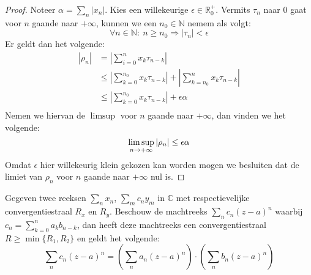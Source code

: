 \documentclass[main.tex]{subfiles}
\begin{document}
\begin{bst}
\begin{proof}
    Noteer $\alpha = \sum_{n}|x_{n}|$.
    Kies een willekeurige $\epsilon \in \mathbb{R}_{0}^{+}$.
    Vermits $\tau_{n}$ naar $0$ gaat voor $n$ gaande naar $+\infty$, kunnen we een $n_{0}\in \mathbb{N}$ nemem als volgt:
    \[ \forall n\in \mathbb{N}:\ n \ge n_{0} \Rightarrow |\tau_{n}| < \epsilon \]
    Er geldt dan het volgende:
    \[
    \begin{array}{rl}
      |\rho_{n}|
      &= \left|\sum_{i=0}^{n}x_{k}\tau_{n-k}\right|\\
      &\le \left|\sum_{k=0}^{n_{0}}x_{k}\tau_{n-k}\right|+\left|\sum_{k=n_{0}}^{n}x_{k}\tau_{n-k}\right|\\
      &\le \left|\sum_{k=0}^{n_{0}}x_{k}\tau_{n-k}\right|+\epsilon\alpha\\
    \end{array}
    \]
    Nemen we hiervan de $\limsup$ voor $n$ gaande naar $+\infty$, dan vinden we het volgende:
    \[
      \limsup_{n\rightarrow +\infty}|\rho_{n}|
      \le \epsilon\alpha\\
    \]
    Omdat $\epsilon$ hier willekeurig klein gekozen kan worden mogen we besluiten dat de limiet van $\rho_{n}$ voor $n$ gaande naar $+\infty$ nul is.\waarom
  \end{proof}
\end{bst}

\begin{bpr}
  Gegeven twee reeksen $\sum_{n}x_{n}$, $\sum_{m}c_{n}y_{m}$ in $\mathbb{C}$ met respectievelijke convergentiestraal $R_{x}$ en $R_{y}$.
  Beschouw de machtreeks $\sum_{n}c_{n}(z-a)^{n}$ waarbij $c_{n} = \sum_{k=0}^{n}a_{k}b_{n-k}$, dan heeft deze machtreeks een convergentiestraal $R \ge \min\{R_{1},R_{2}\}$ en geldt het volgende:
  \[ \sum_{n}c_{n}(z-a)^{n} = \left( \sum_{n}a_{n}(z-a)^{n}\right)\cdot \left( \sum_{n}b_{n}(z-a)^{n}\right) \]
\end{bpr}
\end{document}
